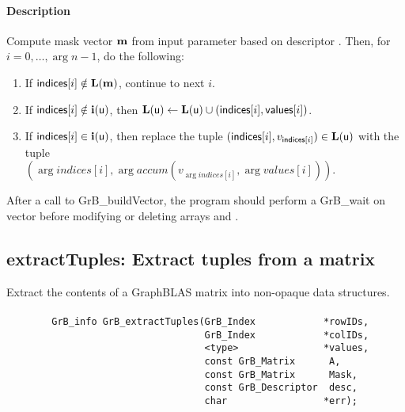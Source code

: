 \paragraph{Description}

Compute mask vector $\vector{m}$ from input parameter  based on descriptor .
Then, for $i = 0,\ldots,\arg{n}-1$, do the following:
\begin{enumerate}
    \item If $\arg{indices}[i] \notin \bold{L}(\vector{m})$, continue to next $i$.
    \item If $\arg{indices}[i] \notin \bold{i}(\arg{u})$, then $\bold{L}(\arg{u}) \leftarrow \bold{L}(\arg{u}) \cup (\arg{indices}[i], \arg{values}[i])$.
    \item If $\arg{indices}[i] \in \bold{i}(\arg{u})$, then replace the tuple $(\arg{indices}[i], v_{\arg{indices}[i]}) \in \bold{L}(\arg{u})$ with the tuple \\ $(\arg{indices}[i], \arg{accum}(v_{\arg{indices}[i]},\arg{values}[i]))$.
\end{enumerate}

After a call to {\sf GrB\_buildVector}, the program should perform a {\sf GrB\_wait} on vector  before
modifying or deleting arrays  and .


\subsection{{\sf extractTuples}: Extract tuples from a matrix}
\label{Sec:extractTuples}

Extract the contents of a GraphBLAS matrix into non-opaque data structures.

\paragraph{\syntax}

\begin{verbatim}
        GrB_info GrB_extractTuples(GrB_Index            *rowIDs,
                                   GrB_Index            *colIDs,
                                   <type>               *values, 
                                   const GrB_Matrix      A,
                                   const GrB_Matrix      Mask,
                                   const GrB_Descriptor  desc,
                                   char                 *err);
\end{verbatim}

